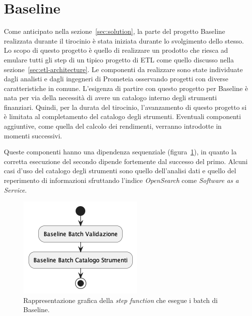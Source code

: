\section{Baseline}\label{sec:baseline-architecture}
Come anticipato nella sezione~\ref{sec:solution}, la parte del progetto Baseline realizzata durante il tirocinio è stata iniziata durante lo svolgimento dello stesso.
Lo scopo di questo progetto è quello di realizzare un prodotto che riesca ad emulare tutti gli step di un tipico progetto di ETL come quello discusso nella sezione~\ref{sec:etl-architecture}.
Le componenti da realizzare sono state individuate dagli analisti e dagli ingegneri di Prometeia osservando progetti con diverse caratteristiche in comune.
L'esigenza di partire con questo progetto per Baseline è nata per via della necessità di avere un catalogo interno degli strumenti finanziari.
Quindi, per la durata del tirocinio, l'avanzamento di questo progetto si è limitata al completamento del catalogo degli strumenti.
Eventuali componenti aggiuntive, come quella del calcolo dei rendimenti, verranno introdotte in momenti successivi.

Queste componenti hanno una dipendenza sequenziale (figura~\ref{fig:baseline-dependency}), in quanto la corretta esecuzione del secondo dipende fortemente dal successo del primo.
Alcuni casi d'uso del catalogo degli strumenti sono quello dell'analisi dati e quello del reperimento di informazioni sfruttando l'indice \textit{OpenSearch} come \textit{Software as a Service}.
\begin{figure}
    \includegraphics[width=.6\textwidth]{img/baseline-dependency.png}
    \centering
    \caption{Rappresentazione grafica della \textit{step function} che esegue i batch di Baseline.}
    \label{fig:baseline-dependency}
\end{figure}

